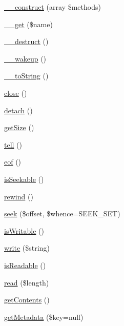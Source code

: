\begin{DoxyCompactItemize}
\item 
\hyperlink{classGuzzleHttp_1_1Psr7_1_1FnStream_ab24256dde91f757958e246ed84b8e651}{\+\_\+\+\_\+construct} (array \$methods)
\item 
\hyperlink{classGuzzleHttp_1_1Psr7_1_1FnStream_a0cb7bdbb2b50ef87622aab43d1f9048d}{\+\_\+\+\_\+get} (\$name)
\item 
\hyperlink{classGuzzleHttp_1_1Psr7_1_1FnStream_a92bd0f82b4b67f59914c29018bd29346}{\+\_\+\+\_\+destruct} ()
\item 
\hyperlink{classGuzzleHttp_1_1Psr7_1_1FnStream_ae684f892bfd98ed198432fe26ad43963}{\+\_\+\+\_\+wakeup} ()
\item 
\hyperlink{classGuzzleHttp_1_1Psr7_1_1FnStream_afa1de61c8570fc1009d328008249c2fc}{\+\_\+\+\_\+to\+String} ()
\item 
\hyperlink{classGuzzleHttp_1_1Psr7_1_1FnStream_a45793fd71b5136c5dbfcac2c25950cc4}{close} ()
\item 
\hyperlink{classGuzzleHttp_1_1Psr7_1_1FnStream_a0de4cb9ea46e419a73c9005d8fe93867}{detach} ()
\item 
\hyperlink{classGuzzleHttp_1_1Psr7_1_1FnStream_a736dbff0dbf809c32e29c9e7805ccdeb}{get\+Size} ()
\item 
\hyperlink{classGuzzleHttp_1_1Psr7_1_1FnStream_ada664b3551d9ec37a20ded966d930508}{tell} ()
\item 
\hyperlink{classGuzzleHttp_1_1Psr7_1_1FnStream_a9e01510a73317b43ef96fdfc7cc7e1c8}{eof} ()
\item 
\hyperlink{classGuzzleHttp_1_1Psr7_1_1FnStream_a6e71bee66417963b7dbab145c209da6c}{is\+Seekable} ()
\item 
\hyperlink{classGuzzleHttp_1_1Psr7_1_1FnStream_a8b27960dc20fe35531b4d1c2f124b605}{rewind} ()
\item 
\hyperlink{classGuzzleHttp_1_1Psr7_1_1FnStream_ae1f0b15fdfdf1e432c66ed01127cb01a}{seek} (\$offset, \$whence=S\+E\+E\+K\+\_\+\+S\+ET)
\item 
\hyperlink{classGuzzleHttp_1_1Psr7_1_1FnStream_a4ea21aece18cb3b83315dba95dcac9c7}{is\+Writable} ()
\item 
\hyperlink{classGuzzleHttp_1_1Psr7_1_1FnStream_ac7198f1b1058da5bde01c2f13b774c56}{write} (\$string)
\item 
\hyperlink{classGuzzleHttp_1_1Psr7_1_1FnStream_a2f45ad8af60ff908f1aac72e0887452f}{is\+Readable} ()
\item 
\hyperlink{classGuzzleHttp_1_1Psr7_1_1FnStream_a514406fd0b0a778e0c94c5327ed7ce0c}{read} (\$length)
\item 
\hyperlink{classGuzzleHttp_1_1Psr7_1_1FnStream_addd020a7528c39a029acef51538c42ab}{get\+Contents} ()
\item 
\hyperlink{classGuzzleHttp_1_1Psr7_1_1FnStream_a9c89106787767a9c5d48ea71c72ace45}{get\+Metadata} (\$key=null)
\end{DoxyCompactItemize}
